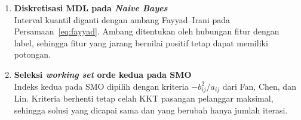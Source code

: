 \begin{enumerate}
    Atribut kontinu dengan $N$ nilai berbeda memiliki $N-1$ kandidat ambang, sehingga peluang menemukan ambang yang tampak baik secara kebetulan meningkat. Quinlan mengusulkan pengurangan \textit{information gain} sebesar $\log_2(N-1)/|D|$, dengan $|D|$ jumlah sampel pada simpul. Penalti ini mengikuti prinsip \textit{minimum description length} (MDL), yaitu biaya untuk menyandikan pilihan ambang, dan atribut yang \textit{gain}-nya tidak positif setelah dikurangi penalti tidak dipakai.
    \item \textbf{Diskretisasi MDL pada \textit{Naive Bayes}}\\
    Interval kuantil diganti dengan ambang Fayyad--Irani pada Persamaan~\ref{eq:fayyad}. Ambang ditentukan oleh hubungan fitur dengan label, sehingga fitur yang jarang bernilai positif tetap dapat memiliki potongan.
    \item \textbf{Seleksi \textit{working set} orde kedua pada SMO}\\
    Indeks kedua pada SMO dipilih dengan kriteria $-b_{ij}^2/a_{ij}$ dari Fan, Chen, dan Lin. Kriteria berhenti tetap celah KKT pasangan pelanggar maksimal, sehingga solusi yang dicapai sama dan yang berubah hanya jumlah iterasi.
\end{enumerate}
